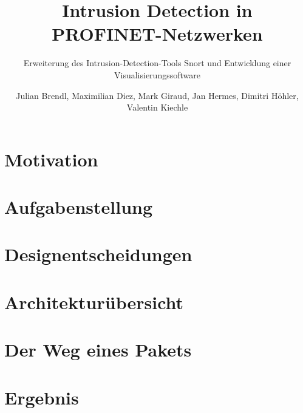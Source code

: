 \documentclass[18pt]{beamer}
\title[Intrusion Detection in PROFINET-Netzwerken]{Intrusion Detection in PROFINET-Netzwerken}
\subtitle{Erweiterung des Intrusion-Detection-Tools Snort und Entwicklung einer Visualisierungssoftware}
\author{Julian Brendl, Maximilian Diez, Mark Giraud, Jan Hermes, Dimitri Höhler, Valentin Kiechle}
\institute{Fraunhofer IOSB: Gruppe für sichere vernetzte Systeme}
\begin{document}

\begin{frame}
\titlepage
\end{frame}

\section{Motivation}
    
\section{Aufgabenstellung}
    
\section{Designentscheidungen}
    
\section{Architekturübersicht}
	
\section{Der Weg eines Pakets}
	
\section{Ergebnis}
    
\end{document}
